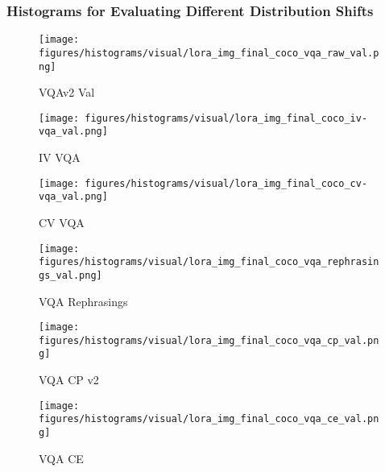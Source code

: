 


\subsubsection{Histograms for Evaluating Different Distribution Shifts}



\begin{figure*}[!h]
    \centering
    
    \begin{subfigure}[b]{0.3\linewidth}
        \centering
        \texttt{[image: figures/histograms/visual/lora\_img\_final\_coco\_vqa\_raw\_val.png]}
        \caption{VQAv2 Val}
        \label{fig:VQAv2_val}
    \end{subfigure}
    \hfill
    \begin{subfigure}[b]{0.3\linewidth}
        \centering
        \texttt{[image: figures/histograms/visual/lora\_img\_final\_coco\_iv-vqa\_val.png]}
        \caption{IV VQA}
        \label{fig:ivvqa}
    \end{subfigure}
    \hfill
    \begin{subfigure}[b]{0.3\linewidth}
        \centering
        \texttt{[image: figures/histograms/visual/lora\_img\_final\_coco\_cv-vqa\_val.png]}
        \caption{CV VQA}
        \label{fig:vcvvqa}
    \end{subfigure}

    \vspace{0.5cm} %

    \begin{subfigure}[b]{0.3\linewidth}
        \centering
        \texttt{[image: figures/histograms/visual/lora\_img\_final\_coco\_vqa\_rephrasings\_val.png]}
        \caption{VQA Rephrasings}
        \label{fig:vvqa_rephrasings}
    \end{subfigure}
    \hfill
    \begin{subfigure}[b]{0.3\linewidth}
        \centering
        \texttt{[image: figures/histograms/visual/lora\_img\_final\_coco\_vqa\_cp\_val.png]}
        \caption{VQA CP v2}
        \label{fig:vvqa_cp_v2}
    \end{subfigure}
    \hfill
    \begin{subfigure}[b]{0.3\linewidth}
        \centering
        \texttt{[image: figures/histograms/visual/lora\_img\_final\_coco\_vqa\_ce\_val.png]}
        \caption{VQA CE}
        \label{fig:vvqa_ce}
    \end{subfigure}


\end{figure*}
